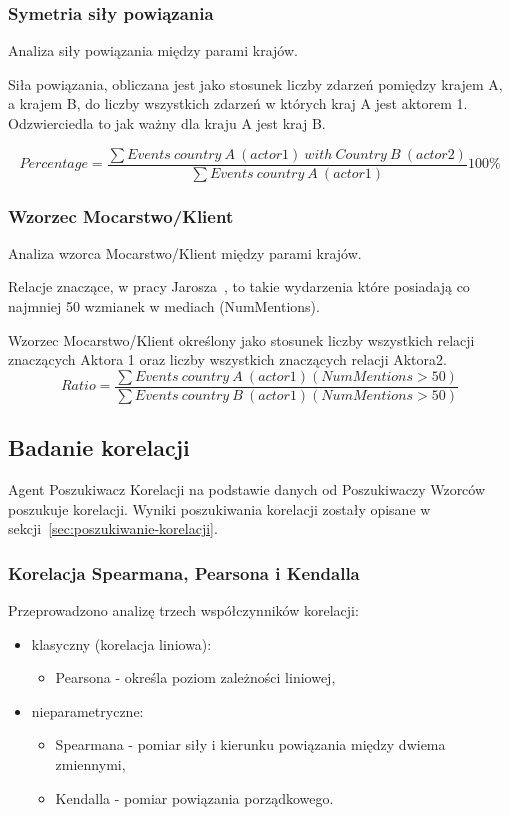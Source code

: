 \documentclass[11pt]{report}
\begin{document}
    \subsubsection{Symetria siły powiązania}
    Analiza siły powiązania między parami krajów.

    Siła powiązania, obliczana jest jako stosunek liczby zdarzeń pomiędzy krajem A, a krajem B, do liczby wszystkich zdarzeń w których kraj A jest aktorem 1.
    Odzwierciedla to jak ważny dla kraju A jest kraj B\@.


    \[ Percentage = \frac
    {\sum{Events\ country\ A\ (actor 1)\ with\ Country\ B\ (actor 2)}}
    {\sum{Events\ country\ A\ (actor 1)}}
    100 \%
    \]

    \subsubsection{Wzorzec Mocarstwo/Klient}
    Analiza wzorca Mocarstwo/Klient między parami krajów.

    Relacje znaczące, w pracy Jarosza~\cite{Jarosz2020}, to takie wydarzenia które posiadają co najmniej 50 wzmianek w mediach (NumMentions). %

    Wzorzec Mocarstwo/Klient określony jako stosunek liczby wszystkich relacji znaczących Aktora 1 oraz liczby wszystkich znaczących relacji Aktora2. %
    \[ Ratio = \frac
    {\sum{Events\ country\ A\ (actor 1) (NumMentions > 50)}}
    {\sum{Events\ country\ B\ (actor 1) (NumMentions > 50)}}
    \]

    \subsection{Badanie korelacji}
    Agent Poszukiwacz Korelacji na podstawie danych od Poszukiwaczy Wzorców poszukuje korelacji.
    Wyniki poszukiwania korelacji zostały opisane w sekcji~\ref{sec:poszukiwanie-korelacji}.

    \subsubsection{Korelacja Spearmana, Pearsona i Kendalla}

    Przeprowadzono analizę trzech współczynników korelacji:
    \begin{itemize}
        \item klasyczny (korelacja liniowa):
        \begin{itemize}
            \item Pearsona - określa poziom zależności liniowej,
        \end{itemize}
        \item nieparametryczne:
        \begin{itemize}
            \item Spearmana - pomiar siły i kierunku powiązania między dwiema zmiennymi,
            \item Kendalla - pomiar powiązania porządkowego.
        \end{itemize}
    \end{itemize}
\end{document}
